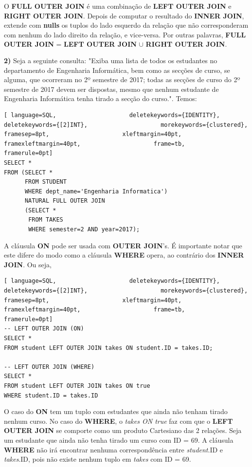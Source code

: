 \documentclass[oneside]{book}
\theoremstyle{definition}
\begin{document}
O \textbf{FULL OUTER JOIN} é uma combinação de \textbf{LEFT OUTER JOIN} e \textbf{RIGHT OUTER JOIN}. Depois de computar o resultado do \textbf{INNER JOIN}, extende com \textbf{nulls} os tuplos do lado esquerdo da relação que não corresponderam com nenhum do lado direito da relação, e vice-versa. Por outras palavras, \textbf{FULL OUTER JOIN} = \textbf{LEFT OUTER JOIN} $\cup$ \textbf{RIGHT OUTER JOIN}.

\textbf{2)} Seja a seguinte consulta: "Exiba uma lista de todos os estudantes no departamento de Engenharia Informática, bem como as secções de curso, se alguma, que ocorreram no 2º semestre de 2017; todas as secções de curso do 2º semestre de 2017 devem ser dispostas, mesmo que nenhum estudante de Engenharia Informática tenha tirado a secção do curso.". Temos:
\begin{lstlisting}[ language=SQL,                     deletekeywords={IDENTITY},                     deletekeywords={[2]INT},                     morekeywords={clustered},                     framesep=8pt,                     xleftmargin=40pt,                     framexleftmargin=40pt,                     frame=tb,                     framerule=0pt]
SELECT *
FROM (SELECT *
      FROM STUDENT
      WHERE dept_name='Engenharia Informatica')
      NATURAL FULL OUTER JOIN
      (SELECT * 
       FROM TAKES
       WHERE semester=2 AND year=2017);
\end{lstlisting}

A cláusula \textbf{ON} pode ser usada com \textbf{OUTER JOIN}'s. É importante notar que este difere do modo como a cláusula \textbf{WHERE} opera, ao contrário dos \textbf{INNER JOIN}.
Ou seja,
\begin{lstlisting}[ language=SQL,                     deletekeywords={IDENTITY},                     deletekeywords={[2]INT},                     morekeywords={clustered},                     framesep=8pt,                     xleftmargin=40pt,                     framexleftmargin=40pt,                     frame=tb,                     framerule=0pt]
-- LEFT OUTER JOIN (ON)
SELECT *
FROM student LEFT OUTER JOIN takes ON student.ID = takes.ID;

-- LEFT OUTER JOIN (WHERE)
SELECT *
FROM student LEFT OUTER JOIN takes ON true
WHERE student.ID = takes.ID
\end{lstlisting}

O caso do \textbf{ON} tem um tuplo com estudantes que ainda não tenham tirado nenhum curso. No caso do \textbf{WHERE}, o \textit{takes ON true} faz com que o \textbf{LEFT OUTER JOIN} se comporte como um produto Cartesiano das 2 relações. Seja um estudante que ainda não tenha tirado um curso com ID = 69. A cláusula \textbf{WHERE} não irá encontrar nenhuma correspondência entre \textit{student}.ID e \textit{takes}.ID, pois não existe nenhum tuplo em \textit{takes} com ID = 69.
\end{document}
